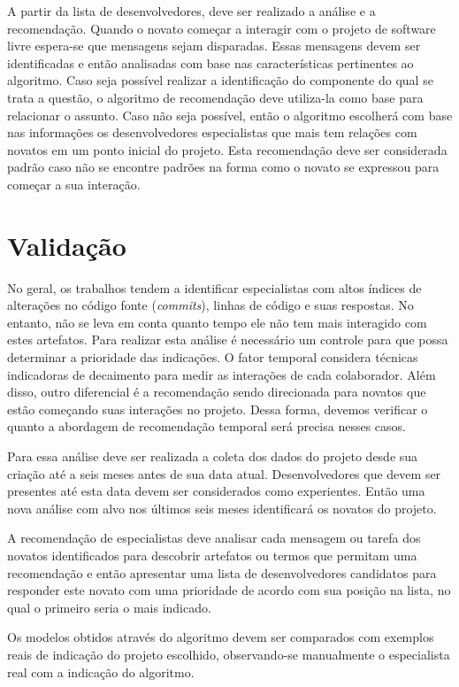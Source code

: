 \documentclass[oneside,brazil,a4paper]{normas-utf-tex}
\begin{document}
A partir da lista de desenvolvedores, deve ser realizado a análise e a recomendação. Quando o novato começar a interagir com o projeto de software livre espera-se que mensagens sejam disparadas. Essas mensagens devem ser identificadas e então analisadas com base nas características pertinentes ao algoritmo. Caso seja possível realizar a identificação do componente do qual se trata a questão, o algoritmo de recomendação deve utiliza-la como base para relacionar o assunto. Caso não seja possível, então o algoritmo escolherá com base nas informações os desenvolvedores especialistas que mais tem relações com novatos em um ponto inicial do projeto. Esta recomendação deve ser considerada padrão caso não se encontre padrões na forma como o novato se expressou para começar a sua interação.


\section{Validação}

No geral, os trabalhos tendem a identificar especialistas com altos índices de alterações no código fonte (\textit{commits}), linhas de código e suas respostas. No entanto, não se leva em conta quanto tempo ele não tem mais interagido com estes artefatos. Para realizar esta análise é necessário um controle para que possa determinar a prioridade das indicações. O fator temporal considera técnicas indicadoras de decaimento para medir as interações de cada colaborador. Além disso, outro diferencial é a recomendação sendo direcionada para novatos que estão começando suas interações no projeto. Dessa forma, devemos verificar o quanto a abordagem de recomendação temporal será precisa nesses casos.  

Para essa análise deve ser realizada a coleta dos dados do projeto desde sua criação até a seis meses antes de sua data atual. Desenvolvedores que devem ser presentes até esta data devem ser considerados como experientes. Então uma nova análise com alvo nos últimos seis meses  identificará os novatos do projeto.
 
A recomendação de especialistas deve analisar cada mensagem ou tarefa dos novatos identificados para descobrir artefatos ou termos que permitam uma recomendação e então apresentar uma lista de desenvolvedores candidatos para responder este novato com uma prioridade de acordo com sua posição na lista, no qual o primeiro seria o mais indicado. 

Os modelos obtidos através do algoritmo devem ser comparados com exemplos reais de indicação do projeto escolhido, observando-se manualmente o especialista real com a indicação do algoritmo. 
\end{document}
